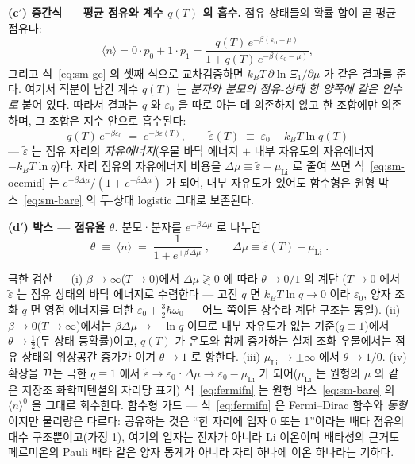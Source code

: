 \textbf{(c$'$) 중간식 --- 평균 점유와 계수 $q(T)$ 의 흡수.} 점유 상태들의 확률 합이 곧 평균 점유다:
\begin{equation}
\langle n\rangle=0\cdot p_0+1\cdot p_1
=\frac{q(T)\,e^{-\beta(\varepsilon_0-\mu)}}{1+q(T)\,e^{-\beta(\varepsilon_0-\mu)}},
\label{eq:sm-occmid}
\end{equation}
그리고 식~\eqref{eq:sm-gc} 의 셋째 식으로 교차검증하면 $k_BT\,\partial\ln\Xi_1/\partial\mu$ 가 같은
결과를 준다. 여기서 적분이 남긴 계수 $q(T)$ 는 \emph{분자와 분모의 점유-상태 항 양쪽에 같은 인수로}
붙어 있다. 따라서 결과는 $q$ 와 $\varepsilon_0$ 을 따로 아는 데 의존하지 않고 한 조합에만 의존하며,
그 조합은 지수 안으로 흡수된다:
\begin{equation}
q(T)\,e^{-\beta\varepsilon_0}\;=\;e^{-\beta\tilde\varepsilon(T)},
\qquad
\tilde\varepsilon(T)\;\equiv\;\varepsilon_0-k_BT\ln q(T)
\label{eq:sm-epstilde}
\end{equation}
--- $\tilde\varepsilon$ 는 점유 자리의 \emph{자유에너지}(우물 바닥 에너지 $+$ 내부 자유도의 자유에너지
$-k_BT\ln q$)다. 자리 점유의 자유에너지 비용을 $\Delta\mu\equiv\tilde\varepsilon-\mu_\mathrm{Li}$ 로
줄여 쓰면 식~\eqref{eq:sm-occmid} 는 $e^{-\beta\Delta\mu}/(1+e^{-\beta\Delta\mu})$ 가 되어, 내부
자유도가 있어도 함수형은 원형 박스~\eqref{eq:sm-bare} 의 두-상태 logistic 그대로 보존된다.

\textbf{(d$'$) 박스 --- 점유율 $\theta$.} 분모·분자를 $e^{-\beta\Delta\mu}$ 로 나누면
\begin{equation}
\boxed{\;\theta\;\equiv\;\langle n\rangle\;=\;\frac{1}{1+e^{+\beta\,\Delta\mu}}\;,
\qquad \Delta\mu\equiv\tilde\varepsilon(T)-\mu_\mathrm{Li}\;.}
\label{eq:fermifn}
\end{equation}
\begin{verifybox}
극한 검산 --- (i) $\beta\to\infty$($T\to0$)에서 $\Delta\mu\gtrless0$ 에 따라 $\theta\to0/1$ 의 계단
($T\to0$ 에서 $\tilde\varepsilon$ 는 점유 상태의 바닥 에너지로 수렴한다 --- 고전 $q$ 면 $k_BT\ln q\to0$
이라 $\varepsilon_0$, 양자 조화 $q$ 면 영점 에너지를 더한 $\varepsilon_0+\tfrac32\hbar\omega_0$ --- 어느
쪽이든 상수라 계단 구조는 동일). (ii) $\beta\to0$($T\to\infty$)에서는 $\beta\Delta\mu\to-\ln q$ 이므로
내부 자유도가 없는 기준($q\equiv1$)에서 $\theta\to\tfrac12$(두 상태 등확률)이고, $q(T)$ 가 온도와 함께
증가하는 실제 조화 우물에서는 점유 상태의 위상공간 증가가 이겨 $\theta\to1$ 로 향한다.
(iii) $\mu_\mathrm{Li}\to\pm\infty$ 에서 $\theta\to1/0$. (iv) 확장을 끄는 극한 $q\equiv1$ 에서
$\tilde\varepsilon\to\varepsilon_0$·$\Delta\mu\to\varepsilon_0-\mu_\mathrm{Li}$ 가 되어($\mu_\mathrm{Li}$ 는 원형의 $\mu$ 와
같은 저장조 화학퍼텐셜의 자리당 표기) 식~\eqref{eq:fermifn} 는 원형 박스~\eqref{eq:sm-bare} 의 $\langle n\rangle^{0}$ 을 그대로 회수한다.
함수형 가드 --- 식~\eqref{eq:fermifn} 은 Fermi--Dirac 함수와 \emph{동형}이지만 물리량은 다르다:
공유하는 것은 ``한 자리에 입자 0 또는 1''이라는 배타 점유의 대수 구조뿐이고(가정 1), 여기의 입자는
전자가 아니라 Li 이온이며 배타성의 근거도 페르미온의 Pauli 배타 같은 양자 통계가 아니라 자리 하나에
이온 하나라는 기하다.
\end{verifybox}

